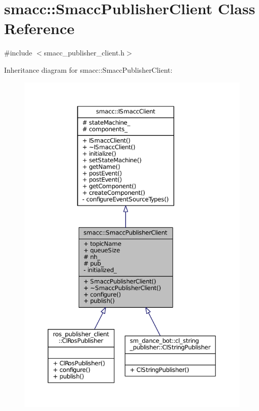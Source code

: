 \hypertarget{classsmacc_1_1SmaccPublisherClient}{}\section{smacc\+:\+:Smacc\+Publisher\+Client Class Reference}
\label{classsmacc_1_1SmaccPublisherClient}


{\ttfamily \#include $<$smacc\+\_\+publisher\+\_\+client.\+h$>$}



Inheritance diagram for smacc\+:\+:Smacc\+Publisher\+Client\+:
\nopagebreak
\begin{figure}[H]
\begin{center}
\leavevmode
\includegraphics[width=350pt]{classsmacc_1_1SmaccPublisherClient__inherit__graph}
\end{center}
\end{figure}


